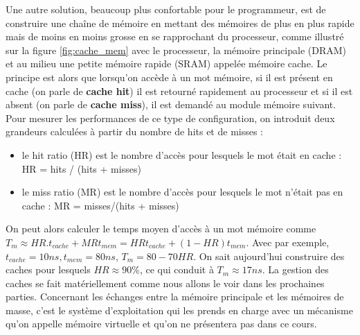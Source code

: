 Une autre solution, beaucoup plus confortable pour le programmeur, est de construire une chaîne de mémoire en mettant des mémoires de plus en plus rapide mais de moins en moins grosse en se rapprochant du processeur, comme illustré sur la figure \ref{fig:cache_mem} avec le processeur, la mémoire principale (DRAM) et au milieu une petite mémoire rapide (SRAM) appelée mémoire cache. Le principe est alors que lorsqu'on accède à un mot mémoire, si il est présent en cache (on parle de \textbf{cache hit}) il est retourné rapidement au processeur et si il est absent (on parle de \textbf{cache miss}), il est demandé au module mémoire suivant. Pour mesurer les performances de ce type de configuration, on introduit deux grandeurs calculées à partir du nombre de hits et de misses :
\begin{itemize}
\item le hit ratio (HR) est le nombre d'accès pour lesquels le mot était en cache : HR = hits / (hits + misses)
\item le miss ratio (MR) est le nombre d'accès pour lesquels le mot n'était pas en cache : MR = misses/(hits + misses)
\end{itemize}
On peut alors calculer le temps moyen d'accès à un mot mémoire comme $T_m \approx HR. t_{cache} + MR t_{mem} = HR t_{cache} + (1 - HR) t_{mem}$. Avec par exemple, $t_{cache} = 10 ns, t_{mem} = 80 ns$, $T_m = 80 - 70 HR$. On sait aujourd'hui construire des caches pour lesquels $HR \approx 90 \%$, ce qui conduit à $T_m \approx 17 ns$. La gestion des caches se fait matériellement comme nous allons le voir dans les prochaines parties. Concernant les échanges entre la mémoire principale et les mémoires de masse, c'est le système d'exploitation qui les prends en charge avec un mécanisme qu'on appelle mémoire virtuelle et qu'on ne présentera pas dans ce cours.








